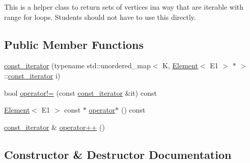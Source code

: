 This is a helper class to return sets of vertices ina way that are iterable with range for loops. Students should not have to use this directly. \subsection*{Public Member Functions}
\begin{DoxyCompactItemize}
\item 
\hyperlink{classbridges_1_1datastructure_1_1_graph_adj_list_1_1const_vertex_element_set__listhelper_1_1const__iterator_a4b7fc58222ec911d26672daa5e255a1d}{const\+\_\+iterator} (typename std\+::unordered\+\_\+map$<$ K, \hyperlink{classbridges_1_1datastructure_1_1_element}{Element}$<$ E1 $>$ $\ast$ $>$\+::\hyperlink{classbridges_1_1datastructure_1_1_graph_adj_list_1_1const_vertex_element_set__listhelper_1_1const__iterator}{const\+\_\+iterator} i)
\item 
bool \hyperlink{classbridges_1_1datastructure_1_1_graph_adj_list_1_1const_vertex_element_set__listhelper_1_1const__iterator_ac30d7d7e8eb8a976f7dd193bc7cb7b1c}{operator!=} (const \hyperlink{classbridges_1_1datastructure_1_1_graph_adj_list_1_1const_vertex_element_set__listhelper_1_1const__iterator}{const\+\_\+iterator} \&it) const
\item 
\hyperlink{classbridges_1_1datastructure_1_1_element}{Element}$<$ E1 $>$ const  $\ast$ \hyperlink{classbridges_1_1datastructure_1_1_graph_adj_list_1_1const_vertex_element_set__listhelper_1_1const__iterator_ae6e06df1132d7d1646385388d28bc8b0}{operator$\ast$} () const
\item 
\hyperlink{classbridges_1_1datastructure_1_1_graph_adj_list_1_1const_vertex_element_set__listhelper_1_1const__iterator}{const\+\_\+iterator} \& \hyperlink{classbridges_1_1datastructure_1_1_graph_adj_list_1_1const_vertex_element_set__listhelper_1_1const__iterator_ad778b5c8406c308e1b80700882171243}{operator++} ()
\end{DoxyCompactItemize}


\subsection{Constructor \& Destructor Documentation}
\mbox{\label{classbridges_1_1datastructure_1_1_graph_adj_list_1_1const_vertex_element_set__listhelper_1_1const__iterator_a4b7fc58222ec911d26672daa5e255a1d}} 
